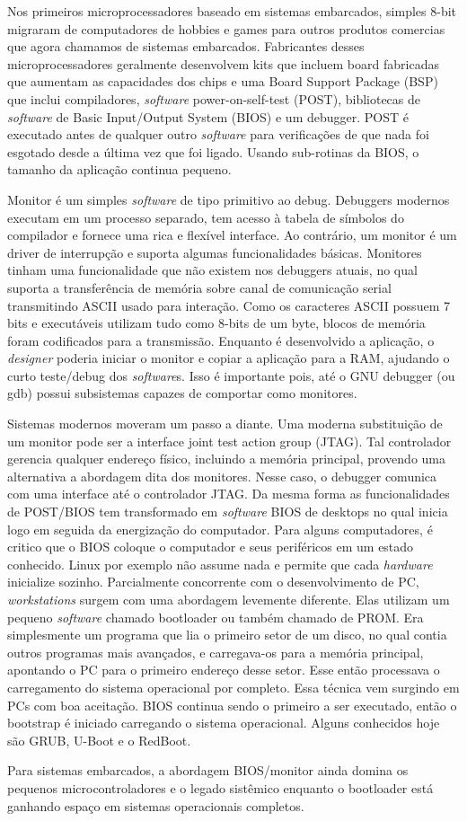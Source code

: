 Nos primeiros microprocessadores baseado em sistemas embarcados, simples 8-bit migraram de computadores de hobbies e games para outros produtos comercias que agora chamamos de sistemas embarcados. Fabricantes desses microprocessadores geralmente desenvolvem kits que incluem board fabricadas que aumentam as capacidades dos chips e uma Board Support Package (BSP) que inclui compiladores, \textit{software} power-on-self-test (POST), bibliotecas de \textit{software} de Basic Input/Output System (BIOS) e um debugger. POST é executado antes de qualquer outro \textit{software} para verificações de que nada foi esgotado desde a última vez que foi ligado. Usando sub-rotinas da BIOS, o tamanho da aplicação continua pequeno.

Monitor é um simples \textit{software} de tipo primitivo ao debug. Debuggers modernos executam em um processo separado, tem acesso à tabela de símbolos do compilador e fornece uma rica e flexível interface. Ao contrário, um monitor é um driver de interrupção e suporta algumas funcionalidades básicas. Monitores tinham uma funcionalidade que não existem nos debuggers atuais, no qual suporta a transferência de memória sobre canal de comunicação serial transmitindo ASCII usado para interação. Como os caracteres ASCII possuem 7 bits e executáveis utilizam tudo como 8-bits de um byte, blocos de memória foram codificados para a transmissão. Enquanto é desenvolvido a aplicação, o \textit{\textit{design}er} poderia iniciar o monitor e copiar a aplicação para a RAM, ajudando o curto teste/debug dos \textit{software}s. Isso é importante pois, até o GNU debugger (ou gdb) possui subsistemas capazes de comportar como monitores.

Sistemas modernos moveram um passo a diante. Uma moderna substituição de um monitor pode ser a interface joint test action group (JTAG). Tal controlador gerencia qualquer endereço físico, incluindo a memória principal, provendo uma alternativa a abordagem dita dos monitores. Nesse caso, o debugger comunica com uma interface até o controlador JTAG. Da mesma forma as funcionalidades de POST/BIOS tem transformado em \textit{software} BIOS de desktops no qual inicia logo em seguida da energização do computador. Para alguns computadores, é critico que o BIOS coloque o computador e seus periféricos em um estado conhecido. Linux por exemplo não assume nada e permite que cada \textit{hardware} inicialize sozinho. Parcialmente concorrente com o desenvolvimento de PC, \textit{\textit{workstation}s} surgem com uma abordagem levemente diferente. Elas utilizam um pequeno \textit{software} chamado bootloader ou também chamado de PROM. Era simplesmente um programa que lia o primeiro setor de um disco, no qual contia outros programas mais avançados, e carregava-os para a memória principal, apontando o PC para o primeiro endereço desse setor. Esse então processava o carregamento do sistema operacional por completo. Essa técnica vem surgindo em PCs com boa aceitação. BIOS continua sendo o primeiro a ser executado, então o bootstrap é iniciado carregando o sistema operacional. Alguns conhecidos hoje são GRUB, U-Boot e o RedBoot.

Para sistemas embarcados, a abordagem BIOS/monitor ainda domina os pequenos microcontroladores e o legado sistêmico enquanto o bootloader está ganhando espaço em sistemas operacionais completos.

